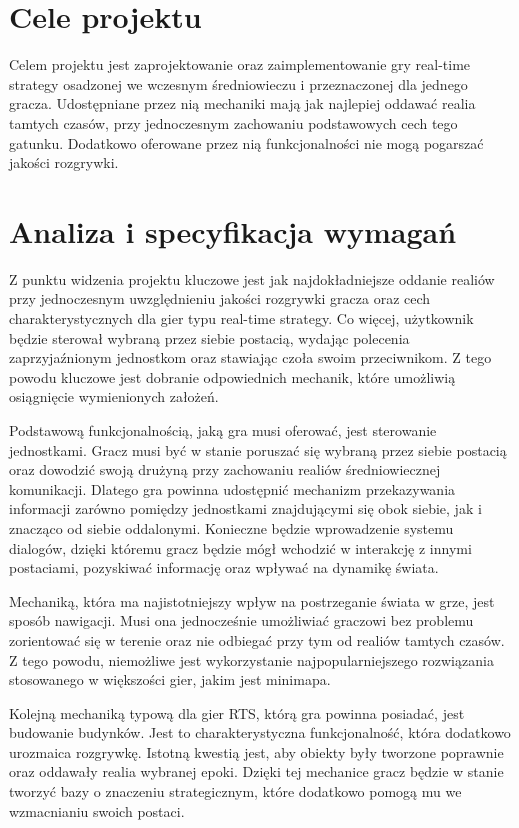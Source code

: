 \section{Cele projektu}
Celem projektu jest zaprojektowanie oraz zaimplementowanie gry real-time strategy osadzonej we wczesnym średniowieczu i
przeznaczonej dla jednego gracza. Udostępniane przez nią mechaniki mają jak najlepiej oddawać realia tamtych czasów, przy
jednoczesnym zachowaniu podstawowych cech tego gatunku. Dodatkowo oferowane przez nią funkcjonalności nie mogą pogarszać
jakości rozgrywki.

\section{Analiza i specyfikacja wymagań}
Z punktu widzenia projektu kluczowe jest jak najdokładniejsze oddanie realiów przy jednoczesnym uwzględnieniu jakości
rozgrywki gracza oraz cech charakterystycznych dla gier typu real-time strategy. Co więcej, użytkownik będzie sterował
wybraną przez siebie postacią, wydając polecenia zaprzyjaźnionym jednostkom oraz stawiając czoła swoim przeciwnikom. Z
tego powodu kluczowe jest dobranie odpowiednich mechanik, które umożliwią osiągnięcie wymienionych założeń.

Podstawową funkcjonalnością, jaką gra musi oferować, jest sterowanie jednostkami. Gracz musi być w stanie poruszać się
wybraną przez siebie postacią oraz dowodzić swoją drużyną przy zachowaniu realiów średniowiecznej komunikacji. Dlatego
gra powinna udostępnić mechanizm przekazywania informacji zarówno pomiędzy jednostkami znajdującymi się obok siebie, jak
i znacząco od siebie oddalonymi. Konieczne będzie wprowadzenie systemu dialogów, dzięki któremu gracz będzie mógł wchodzić
w interakcję z innymi postaciami, pozyskiwać informację oraz wpływać na dynamikę świata.

Mechaniką, która ma najistotniejszy wpływ na postrzeganie świata w grze, jest sposób nawigacji. Musi ona jednocześnie
umożliwiać graczowi bez problemu zorientować się w terenie oraz nie odbiegać przy tym od realiów tamtych czasów. Z tego
powodu, niemożliwe jest wykorzystanie najpopularniejszego rozwiązania stosowanego w większości gier, jakim jest minimapa.

Kolejną mechaniką typową dla gier RTS, którą gra powinna posiadać, jest budowanie budynków. Jest to charakterystyczna
funkcjonalność, która dodatkowo urozmaica rozgrywkę. Istotną kwestią jest, aby obiekty były tworzone poprawnie oraz oddawały
realia wybranej epoki. Dzięki tej mechanice gracz będzie w stanie tworzyć bazy o znaczeniu strategicznym, które dodatkowo
pomogą mu we wzmacnianiu swoich postaci.

